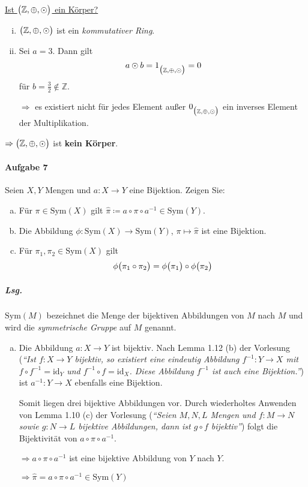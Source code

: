 \documentclass{scrreprt}
\newcommand\Sym{\text{Sym}}
\begin{document}
\underline{Ist $\qty\big(\mathbb{Z}, \oplus, \odot)$ ein Körper?}
\begin{enumerate}[(i)]
\item $\qty\big(\mathbb{Z}, \oplus, \odot)$ ist ein \emph{kommutativer Ring}.
\item Sei $a = 3$.
  Dann gilt
  \[
    a \odot b = 1_{\qty\big(\mathbb{Z}, \oplus, \odot)} = 0
  \]
  für $b = \frac{3}{2} \notin \mathbb{Z}$.

  $\Rightarrow$ es existiert nicht für jedes Element außer
  $0_{\qty\big(\mathbb{Z}, \oplus, \odot)}$ ein inverses Element
  der Multiplikation.
\end{enumerate}
$\Rightarrow \qty\big(\mathbb{Z}, \oplus, \odot)$ ist \textbf{kein Körper}.

\newpage
\paragraph{Aufgabe 7} Seien $X, Y$ Mengen und $a \colon X \to Y$ eine Bijektion.
Zeigen Sie:
\begin{enumerate}[(a)]
\item Für $\pi \in \Sym(X)$ gilt
  $\hat\pi \coloneqq a \circ \pi \circ a^{-1} \in \Sym(Y)$.

\item Die Abbildung $\phi \colon \Sym(X) \to \Sym(Y)$,
  $\pi \mapsto \hat\pi$ ist eine Bijektion.

\item Für $\pi_1, \pi_2 \in \Sym(X)$ gilt
  \[
    \phi\qty\big(\pi_1 \circ \pi_2)
    = \phi\qty\big(\pi_1) \circ \phi\qty\big(\pi_2)
  \]
\end{enumerate}

\subparagraph{Lsg.} $\Sym(M)$ bezeichnet die Menge der bijektiven Abbildungen
von $M$ nach $M$ und wird die \emph{symmetrische Gruppe} auf $M$ genannt.
\begin{enumerate}[(a)]
\item Die Abbildung $a \colon X \to Y$ ist bijektiv.
  Nach Lemma 1.12 (b) der Vorlesung (\emph{``Ist $f \colon X \to Y$ bijektiv,
    so existiert eine eindeutig Abbildung $f^{-1} \colon Y \to X$ mit
    $f \circ f^{-1} = \text{id}_Y$ und $f^{-1} \circ f = \text{id}_{X}$.
    Diese Abbildung $f^{-1}$ ist auch eine Bijektion.''})
  ist $a^{-1} \colon Y \to X$ ebenfalls eine Bijektion.

  Somit liegen drei bijektive Abbildungen vor.
  Durch wiederholtes Anwenden von Lemma 1.10 (c) der Vorlesung
  (\emph{``Seien $M, N, L$ Mengen und $f \colon M \to N$ sowie
    $g \colon N \to L$ bijektive Abbildungen, dann ist $g \circ f$
    bijektiv''}) folgt die Bijektivität von $a \circ \pi \circ a^{-1}$.

  $\Rightarrow a \circ \pi \circ a^{-1}$ ist eine bijektive Abbildung von $Y$
  nach $Y$.

  $\Rightarrow \hat\pi = a \circ \pi \circ a^{-1} \in \Sym(Y)$
\end{enumerate}
\end{document}
